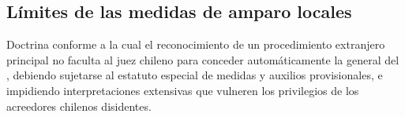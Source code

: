 
\bloqueJurisprudencial

\subsection{Límites de las medidas de amparo locales}

Doctrina conforme a la cual el reconocimiento de un procedimiento extranjero principal no
faculta al juez chileno para conceder automáticamente la \pfc{} general del
, debiendo sujetarse al estatuto especial de medidas y auxilios
provisionales, e impidiendo interpretaciones extensivas que vulneren los privilegios de
los acreedores chilenos disidentes.
